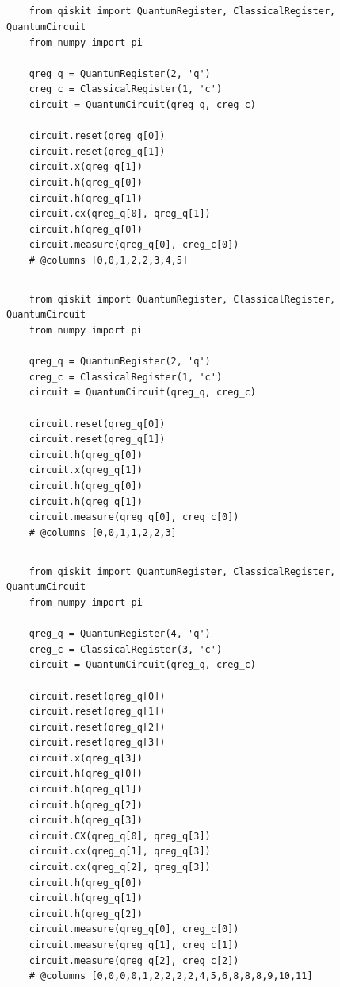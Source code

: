 \documentclass[12pt]{article}
\begin{document}
\subsection*{}

\begin{verbatim}
    from qiskit import QuantumRegister, ClassicalRegister, QuantumCircuit
    from numpy import pi

    qreg_q = QuantumRegister(2, 'q')
    creg_c = ClassicalRegister(1, 'c')
    circuit = QuantumCircuit(qreg_q, creg_c)

    circuit.reset(qreg_q[0])
    circuit.reset(qreg_q[1])
    circuit.x(qreg_q[1])
    circuit.h(qreg_q[0])
    circuit.h(qreg_q[1])
    circuit.cx(qreg_q[0], qreg_q[1])
    circuit.h(qreg_q[0])
    circuit.measure(qreg_q[0], creg_c[0])
    # @columns [0,0,1,2,2,3,4,5]

\end{verbatim}

\subsection*{}

\begin{verbatim}
    from qiskit import QuantumRegister, ClassicalRegister, QuantumCircuit
    from numpy import pi

    qreg_q = QuantumRegister(2, 'q')
    creg_c = ClassicalRegister(1, 'c')
    circuit = QuantumCircuit(qreg_q, creg_c)

    circuit.reset(qreg_q[0])
    circuit.reset(qreg_q[1])
    circuit.h(qreg_q[0])
    circuit.x(qreg_q[1])
    circuit.h(qreg_q[0])
    circuit.h(qreg_q[1])
    circuit.measure(qreg_q[0], creg_c[0])
    # @columns [0,0,1,1,2,2,3]
\end{verbatim}

\newpage

\subsection*{}

\begin{verbatim}
    from qiskit import QuantumRegister, ClassicalRegister, QuantumCircuit
    from numpy import pi
    
    qreg_q = QuantumRegister(4, 'q')
    creg_c = ClassicalRegister(3, 'c')
    circuit = QuantumCircuit(qreg_q, creg_c)
    
    circuit.reset(qreg_q[0])
    circuit.reset(qreg_q[1])
    circuit.reset(qreg_q[2])
    circuit.reset(qreg_q[3])
    circuit.x(qreg_q[3])
    circuit.h(qreg_q[0])
    circuit.h(qreg_q[1])
    circuit.h(qreg_q[2])
    circuit.h(qreg_q[3])
    circuit.CX(qreg_q[0], qreg_q[3])
    circuit.cx(qreg_q[1], qreg_q[3])
    circuit.cx(qreg_q[2], qreg_q[3])
    circuit.h(qreg_q[0])
    circuit.h(qreg_q[1])
    circuit.h(qreg_q[2])
    circuit.measure(qreg_q[0], creg_c[0])
    circuit.measure(qreg_q[1], creg_c[1])
    circuit.measure(qreg_q[2], creg_c[2])
    # @columns [0,0,0,0,1,2,2,2,2,4,5,6,8,8,8,9,10,11]
\end{verbatim}
\end{document}
